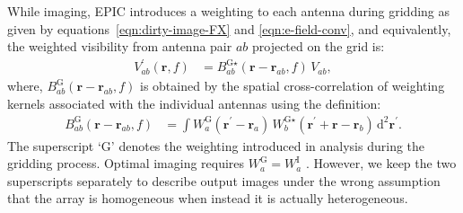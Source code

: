 \documentclass[a4paper,fleqn,usenatbib]{mnras}
\newcommand{\dif}{\mathrm{d}}
\begin{document}
While imaging, EPIC introduces a weighting to each antenna during gridding as given by equations~\ref{eqn:dirty-image-FX} and \ref{eqn:e-field-conv}, and equivalently, the weighted visibility from antenna pair $ab$ projected on the grid is:
\begin{align}
  V^\prime_{ab}(\mathbf{r},f) &= B^{\textrm{G}\star}_{ab}(\mathbf{r}-\mathbf{r}_{ab},f)\,V_{ab},
\end{align}
where, $B^\textrm{G}_{ab}(\mathbf{r}-\mathbf{r}_{ab},f)$ is obtained by the spatial cross-correlation of weighting kernels associated with the individual antennas using the definition:
\begin{align}
  B^\textrm{G}_{ab}(\mathbf{r}-\mathbf{r}_{ab},f) &= \int W^\textrm{G}_a(\mathbf{r}^\prime-\mathbf{r}_a)\,W^{\textrm{G}\star}_b(\mathbf{r}^\prime+\mathbf{r}-\mathbf{r}_b)\,\dif^2\mathbf{r}^\prime.
\end{align}
The superscript `$\textrm{G}$' denotes the weighting introduced in analysis during the gridding process. Optimal imaging requires $W^\textrm{G}_a = W^\textrm{I}_a$ \citep{mor09,mor11}. However, we keep the two superscripts separately to describe output images under the wrong assumption that the array is homogeneous when instead it is actually heterogeneous.
\end{document}
